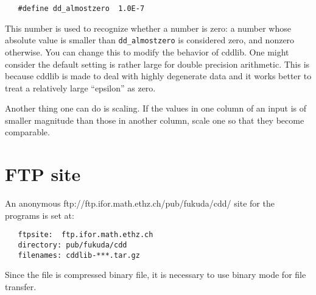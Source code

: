 \documentclass[11pt]{article}
\newcommand {\0} {{\bf 0}}
\begin{document}
\begin{verbatim}
   #define dd_almostzero  1.0E-7
\end{verbatim}
\noindent
This number is used to recognize whether a number is zero:  
a number whose absolute value is smaller
than {\tt dd\_almostzero} is considered zero, and nonzero otherwise.
You can change this to modify the behavior of cddlib.  One might
consider the default setting is rather large for double
precision arithmetic.  This is because cddlib is made
to deal with highly degenerate data and it works better
to treat a relatively large ``epsilon'' as zero.

Another thing one can do is scaling.  If the values in one column of
an input is of smaller magnitude than those in another column, 
scale one so that they become comparable.

\section{FTP site}  \label{FTP}
An anonymous 
{ftp://ftp.ifor.math.ethz.ch/pub/fukuda/cdd/} site for the programs is set at:
\begin{verbatim}
   ftpsite:  ftp.ifor.math.ethz.ch
   directory: pub/fukuda/cdd
   filenames: cddlib-***.tar.gz
\end{verbatim}
Since the file is compressed binary file, it is necessary to use binary mode for
file transfer.
\end{document}

